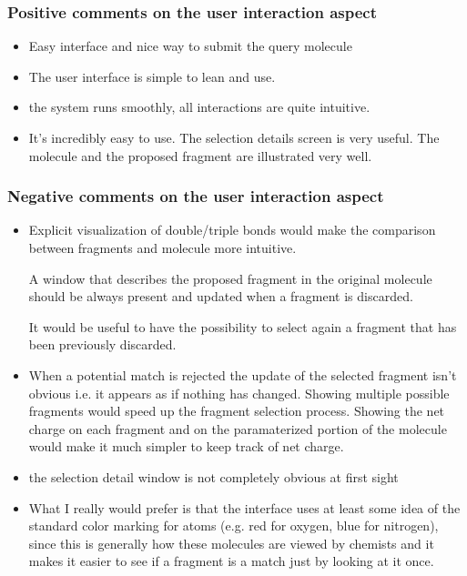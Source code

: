 \subsubsection{Positive comments on the user interaction aspect}
\begin{itemize}
\item Easy interface and nice way to submit the query molecule

\item The user interface is simple to lean and use. 

\item the system runs smoothly, all interactions are quite intuitive.

\item It's incredibly easy to use. The selection details screen is very useful. The molecule and the proposed fragment are illustrated very well.

\end{itemize}


\subsubsection{Negative comments on the user interaction aspect}
\begin{itemize}
\item Explicit visualization of double/triple bonds would make the comparison between fragments and molecule more intuitive.


A window that describes the proposed fragment in the original molecule should be always present and updated when a fragment is discarded.


It would be useful to have the possibility to select again a fragment that has been previously discarded.

\item When a potential match is rejected the update of the selected fragment isn't obvious i.e. it appears as if nothing has changed. Showing multiple possible fragments would speed up the fragment selection process. Showing the net charge on each fragment and on the paramaterized portion of the molecule would make it much simpler to keep track of net charge. 

\item the selection detail window is not completely obvious at first sight

\item What I really would prefer is that the interface uses at least some idea of the standard color marking for atoms (e.g. red for oxygen, blue for nitrogen), since this is generally how these molecules are viewed by chemists and it makes it easier to see if a fragment is a match just by looking at it once.

\end{itemize}


